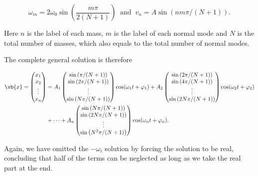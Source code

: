 \documentclass[a4paper,12pt]{report}
\begin{document}
\begin{equation}
	\omega_{m}  = 2 \omega _{0}\sin \left( \frac{m\pi }{2(N+1)}  \right) ~\text { and }~ v_{n} = A \sin \left( nm\pi /(N+1)  \right). \label{normalmode} 
\end{equation}

Here \(n\) is the label of each mass, \(m\) is the label of each normal mode and \(N\) is the total number of masses, which also equals to the total number of normal modes.

The complete general solution is therefore

\begin{equation}
	\begin{aligned} 
	\vb{x} = \begin{pmatrix}
		 x_1  \\
		 x_2  \\
		 \vdots  \\
		 x_{n}  \\
	\end{pmatrix} &= A_1  \begin{pmatrix}
		 \sin \left( \pi /(N+1)  \right) \\
		 \sin \left( 2\pi /(N+1)  \right) \\
		 \vdots  \\
		 \sin \left( N\pi /(N+1)  \right) \\
	\end{pmatrix}\cos (\omega _{1}t+ \varphi _{1}  ) + A_2 \begin{pmatrix}
		 \sin \left( 2\pi /(N+1)  \right) \\
		 \sin \left( 4\pi /(N+1)  \right) \\
		 \vdots  \\
		 \sin \left( 2N\pi /(N+1)  \right) \\
	\end{pmatrix} \cos (\omega _{2}t+\varphi _{2}  ) \\
	&+ \cdots + A_{n} \begin{pmatrix}
		 \sin \left( N\pi /(N+1)  \right) \\
		 \sin \left( 2N\pi /(N+1)  \right) \\
		 \vdots  \\
		 \sin \left( N^2\pi /(N+1)  \right) \\
	\end{pmatrix}\cos (\omega _{n}t+\varphi _{n}  ).
	\end{aligned} 
\end{equation}

Again, we have omitted the \(-\omega _{i} \) solution by forcing the solution to be real, concluding that half of the terms can be neglected as long as we take the real part at the end. 
\end{document}
